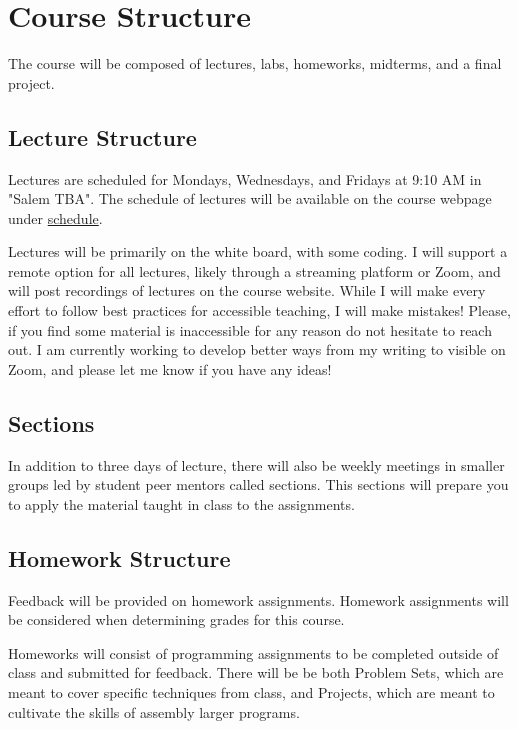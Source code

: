 \documentclass[11pt]{article}
\begin{document}

\section*{Course Structure}

The course will be composed of lectures, labs, homeworks, midterms, and a final project.

\subsection*{Lecture Structure}

Lectures are scheduled for Mondays, Wednesdays, and Fridays at 9:10 AM in "Salem TBA". The schedule
of lectures will be available on the course webpage under \href{https://cd-public.github.io/courses/intro/151f22.html}{schedule}.

\bigskip
\noindent Lectures will be primarily on the white board, with some coding. I will support a remote option
for all lectures, likely through a streaming platform or Zoom, and will post recordings of lectures
on the course website. While I will make every effort to follow best practices for accessible teaching, I will make mistakes! Please, if you find some material is inaccessible for any reason
do not hesitate to reach out. I am currently working to develop better ways from my writing to visible on Zoom, and please let me know if you have any ideas!

\subsection*{Sections}

In addition to three days of lecture, there will also be weekly meetings in smaller groups led by student peer mentors called sections. This sections will prepare you to apply the material taught in class to the assignments.

\subsection*{Homework Structure}

Feedback will be provided on homework assignments. Homework assignments will be considered when determining grades for this course.

\bigskip
\noindent Homeworks will consist of programming assignments to be completed outside of class and submitted
for feedback. There will be be both Problem Sets, which are meant to cover specific techniques from class,
and Projects, which are meant to cultivate the skills of assembly larger programs.
\end{document}
